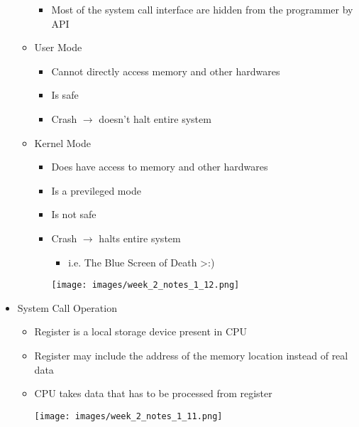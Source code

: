 \documentclass[12pt]{article}
\begin{document}
\begin{itemize}
\begin{itemize}
\begin{itemize}
            \item Most of the system call interface are hidden from the programmer
            by API
        \end{itemize}
        \item User Mode
        \begin{itemize}
            \item Cannot directly access memory and other hardwares
            \item Is safe
            \item Crash $\to$ doesn't halt entire system
        \end{itemize}
        \item Kernel Mode
        \begin{itemize}
            \item Does have access to memory and other hardwares
            \item Is a previleged mode
            \item Is not safe
            \item Crash $\to$ halts entire system
            \begin{itemize}
                \item i.e. The Blue Screen of Death \textgreater :)
            \end{itemize}

            \begin{center}
            \texttt{[image: images/week\_2\_notes\_1\_12.png]}
            \end{center}
        \end{itemize}

    \end{itemize}
    \item System Call Operation

    \begin{itemize}
        \item Register is a local storage device present in CPU
        \item Register may include the address of the memory location instead of real data
        \item CPU takes data that has to be processed from register

        \begin{center}
        \texttt{[image: images/week\_2\_notes\_1\_11.png]}
        \end{center}

    \end{itemize}

\end{itemize}
\end{document}
